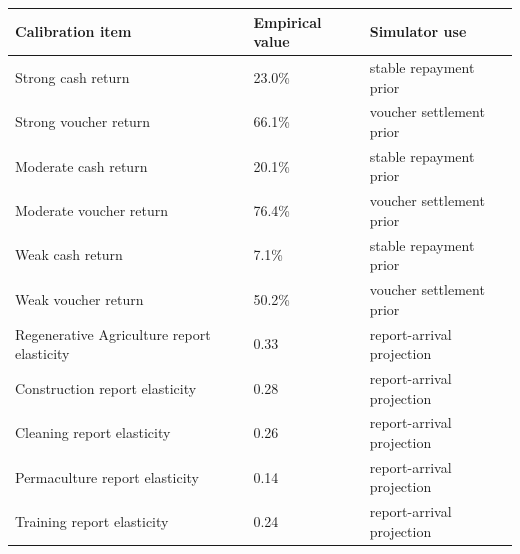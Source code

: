 \begingroup
\small
\setlength{\tabcolsep}{4pt}
\begin{tabular}{lll}
\toprule
Calibration item & Empirical value & Simulator use \\
\midrule
Strong cash return & 23.0\% & stable repayment prior \\
Strong voucher return & 66.1\% & voucher settlement prior \\
Moderate cash return & 20.1\% & stable repayment prior \\
Moderate voucher return & 76.4\% & voucher settlement prior \\
Weak cash return & 7.1\% & stable repayment prior \\
Weak voucher return & 50.2\% & voucher settlement prior \\
Regenerative Agriculture report elasticity & 0.33 & report-arrival projection \\
Construction report elasticity & 0.28 & report-arrival projection \\
Cleaning report elasticity & 0.26 & report-arrival projection \\
Permaculture report elasticity & 0.14 & report-arrival projection \\
Training report elasticity & 0.24 & report-arrival projection \\
\bottomrule
\end{tabular}
\endgroup
